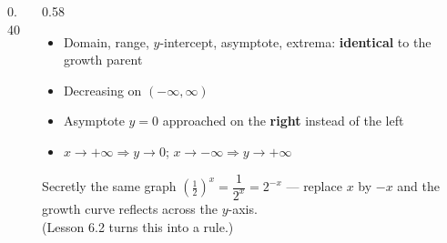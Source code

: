\documentclass[aspectratio=169, 11pt]{beamer}
\newcommand{\lgrid}[4]{%
  \draw[step=1, linegray!45, thin] (#1,#3) grid (#2,#4);
  \draw[->, thick, charcoal] (#1,0)--(#2,0) node[below right, font=\tiny]{$x$};
  \draw[->, thick, charcoal] (0,#3)--(0,#4) node[left, font=\tiny]{$y$};}
\newcommand{\expcurve}[4]{\draw[very thick, forest, domain=#3:#4, samples=120, smooth]
  plot (\x,{#1*exp((#2)*(\x))});}
\begin{document}
\begin{frame}[t, plain]
  \begin{columns}[T]
    \begin{column}{0.40\textwidth}
      \centering
    \end{column}
    \begin{column}{0.58\textwidth}
      \footnotesize
      \begin{itemize}\setlength{\itemsep}{3pt}
        \item Domain, range, $y$-intercept, asymptote, extrema: \textbf{identical} to the growth parent
        \item Decreasing on $(-\infty,\infty)$
        \item Asymptote $y=0$ approached on the \textbf{right} instead of the left
        \item $x\to+\infty \Rightarrow y\to 0$; \quad $x\to-\infty \Rightarrow y\to+\infty$
      \end{itemize}
      \vspace{3pt}
      \begin{block}{Secretly the same graph}
        $\left(\tfrac12\right)^{x}=\dfrac{1}{2^{x}}=2^{-x}$ --- replace $x$ by $-x$ and the growth
        curve reflects across the $y$-axis. \\[3pt]
        {\scriptsize (Lesson 6.2 turns this into a rule.)}
      \end{block}
    \end{column}
  \end{columns}
\end{frame}
\end{document}
